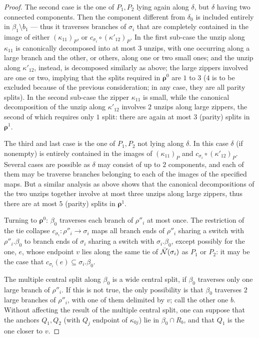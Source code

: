 \begin{proof}
The second case is the one of $P_1,P_2$ lying again along $\delta$, but $\delta$ having two connected components. Then the component different from $\delta_0$ is included entirely in $\beta_1\setminus b_1$ --- thus it traverses branches of $\sigma_i$ that are completely contained in the image of either $(\kappa_{11})_P$, or $c_{\sigma_i}\circ(\kappa'_{12})_P$. In the first sub-case the unzip along $\kappa_{11}$ is canonically decomposed into at most $3$ unzips, with one occurring along a large branch and the other, or others, along one or two small ones; and the unzip along $\kappa'_{12}$, instead, is decomposed similarly as above; the large zippers involved are one or two, implying that the splits required in $\bm\rho^0$ are $1$ to $3$ ($4$ is to be excluded because of the previous consideration; in any case, they are all parity splits). In the second sub-case the zipper $\kappa_{11}$ is small, while the canonical decomposition of the unzip along $\kappa'_{12}$ involves $2$ unzips along large zippers, the second of which requires only $1$ split: there are again at most $3$ (parity) splits in $\bm\rho^1$.

The third and last case is the one of $P_1,P_2$ not lying along $\delta$. In this case $\delta$ (if nonempty) is entirely contained in the images of $(\kappa_{11})_P$ and $c_{\sigma_i}\circ(\kappa'_{12})_P$. Several cases are possible as $\delta$ may consist of up to $2$ components, and each of them may be traverse branches belonging to each of the images of the specified maps. But a similar analysis as above shows that the canonical decompositions of the two unzips together involve at most three unzips along large zippers, thus there are at most $5$ (parity) splits in $\bm\rho^1$.

Turning to $\bm\rho^0$: $\beta_0$ traverses each branch of $\rho''_i$ at most once. The restriction of the tie collapse $c_{\sigma_i}:\rho''_i\rightarrow \sigma_i$ maps all branch ends of $\rho''_i$ sharing a switch with $\rho''_i.\beta_0$ to branch ends of $\sigma_i$ sharing a switch with $\sigma_i.\beta_0$, except possibly for the one, $e$, whose endpoint $v$ lies along the same tie of $\bar{{\mathcal N}}(\sigma_i)$ as $P_1$ or $P_2$: it may be the case that $c_{\sigma_i}(e)\subseteq \sigma_i.\beta_0$.

The multiple central split along $\beta_0$ is a wide central split, if $\beta_0$ traverses only one large branch of $\rho''_i$. If this is not true, the only possibility is that $\beta_0$ traverses $2$ large branches of $\rho''_i$, with one of them delimited by $v$; call the other one $b$. Without affecting the result of the multiple central split, one can suppose that the anchors $Q_1,Q_2$ (with $Q_j$ endpoint of $\kappa_{0j}$) lie in $\beta_0\cap R_b$, and that $Q_1$ is the one closer to $v$.


\end{proof}
